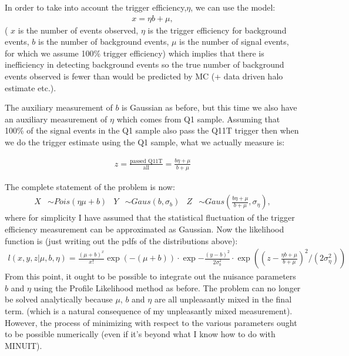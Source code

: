 \documentclass[12pt]{report}
\begin{document}
In order to take into account the trigger efficiency,$\eta$, we can use the model:
\begin{align}
    x = \eta b + \mu,
\end{align}
( $x$ is the number of events observed, $\eta$ is the trigger efficiency for background events,
$b$ is the number of background events, $\mu$ is the number of signal events,
for which we assume 100\% trigger efficiency)
which implies that there is inefficiency in detecting background events 
so the true number of background events observed is fewer than would be predicted by MC (+ data driven halo estimate etc.).

The auxiliary measurement of $b$ is Gaussian as before, but this time we also have an auxiliary measurement of $\eta$
which comes from Q1 sample. 
Assuming that 100\% of the signal events in the Q1 sample also pass the Q11T trigger then when we do the trigger estimate 
using the Q1 sample, what we actually measure is:

\begin{align}
    z = \frac{\textrm{passed Q11T}}{\textrm{all}} = \frac{b \eta + \mu}{b + \mu}
\end{align}

The complete statement of the problem is now:
\begin{align}
    X &\sim Pois( \eta \mu + b ) & Y & \sim Gaus( b, \sigma_b) & Z & \sim Gaus\left( \frac{b \eta + \mu}{b + \mu}, \sigma_\eta \right),
\end{align}
where for simplicity I have assumed that the statistical fluctuation of the trigger efficiency measurement can be approximated as Gaussian.
Now the likelihood function is (just writing out the pdfs of the distributions above):
\begin{align}
    l( x, y, z | \mu, b, \eta ) =  \frac{(\mu  + b )^x}{x!}\exp( - (\mu + b )) \cdot \exp{ -\frac{(y - b)^2}{2 \sigma_b^2}}
    \cdot \exp( (z - \frac{\eta b + \mu}{b + \mu} )^2 / (2\sigma_{\eta}^2) )
\end{align}
From this point, it ought to be possible to integrate out the nuisance parameters $b$ and $\eta$ using the Profile Likelihood method as before.
The problem can no longer be solved analytically because $\mu$, $b$ and $\eta$ are all unpleasantly mixed in the final term.
(which is a natural consequence of my unpleasantly mixed measurement).
However, the process of minimizing with respect to the various parameters ought to be possible numerically
(even if it's beyond what I know how to do with MINUIT).
\end{document}
